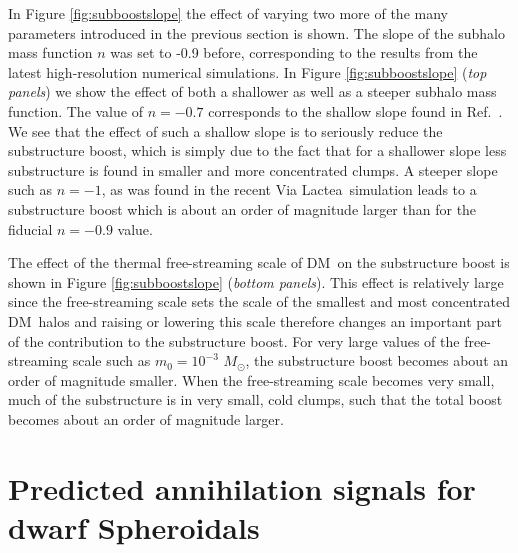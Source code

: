 \documentclass[aps,prd,twocolumn,amsmath,amssymb,floatfix,nofootinbib,10pt]{revtex4}
\newcommand{\VL}{Via Lactea}
\newcommand{\DM}{DM}
\newcommand{\Msol}{\ensuremath{M_{\odot}}}
\newcommand{\Msun}{\Msol}
\begin{document}
In Figure \ref{fig:subboostslope} the effect of varying two more of
the many parameters introduced in the previous section is shown. The
slope of the subhalo mass function $n$ was set to -0.9 before,
corresponding to the results from the latest high-resolution numerical
simulations. In Figure \ref{fig:subboostslope} (\emph{top panels}) we
show the effect of both a shallower as well as a steeper subhalo mass
function. The value of $n = -0.7$ corresponds to the shallow slope
found in Ref.~\cite{2002PhRvD..66f3502H}. We see that the effect of
such a shallow slope is to seriously reduce the substructure boost,
which is simply due to the fact that for a shallower slope less
substructure is found in smaller and more concentrated clumps. A
steeper slope such as $n = -1$, as was found in the recent \VL\
simulation \cite{2008ApJ...686..262K} leads to a substructure boost
which is about an order of magnitude larger than for the fiducial
$n=-0.9$ value.

The effect of the thermal free-streaming scale of \DM\ on the
substructure boost is shown in Figure \ref{fig:subboostslope}
(\emph{bottom panels}). This effect is relatively large since the
free-streaming scale sets the scale of the smallest and most
concentrated \DM\ halos and raising or lowering this scale therefore
changes an important part of the contribution to the substructure
boost. For very large values of the free-streaming scale such as $m_0
= 10^{-3}$ \Msun, the substructure boost becomes about an order of
magnitude smaller. When the free-streaming scale becomes very
small, much of the substructure is in very small, cold clumps, such
that the total boost becomes about an order of magnitude larger.




\section{Predicted annihilation signals for dwarf Spheroidals}\label{sec:dsphs}
\end{document}
